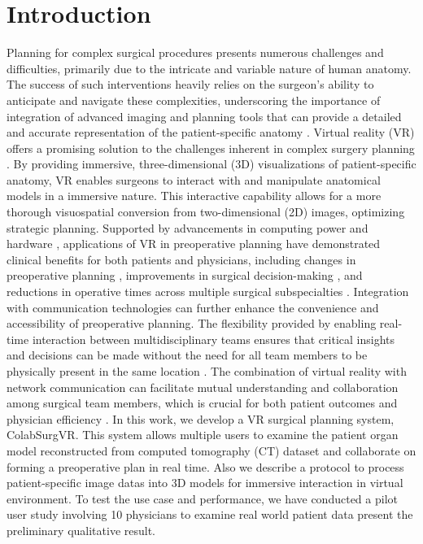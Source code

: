 \documentclass{bmcart}
\begin{document}
\section{Introduction}
Planning for complex surgical procedures presents numerous challenges and difficulties, primarily due to the intricate and variable nature of human anatomy. The success of such interventions heavily relies on the surgeon's ability to anticipate and navigate these complexities, underscoring the importance of integration of advanced imaging and planning tools that can provide a detailed and accurate representation of the patient-specific anatomy \cite{RN30}.
Virtual reality (VR) offers a promising solution to the challenges inherent in complex surgery planning \cite{RN32, RN31, RN2, RN24}. By providing immersive, three-dimensional (3D) visualizations of patient-specific anatomy, VR enables surgeons to interact with and manipulate anatomical models in a immersive nature. This interactive capability allows for a more thorough visuospatial conversion from two-dimensional (2D) images, optimizing strategic planning. Supported by advancements in computing power and hardware \cite{RN33}, applications of VR in preoperative planning have demonstrated clinical benefits for both patients and physicians, including changes in preoperative planning \cite{RN17, RN13, RN37, RN10, RN44, RN29}, improvements in surgical decision-making \cite{RN5}, and reductions in operative times \cite{RN36, RN28} across multiple surgical subspecialties \cite{RN38, RN2}.
Integration with communication technologies can further enhance the convenience and accessibility of preoperative planning. The flexibility provided by enabling real-time interaction between multidisciplinary teams ensures that critical insights and decisions can be made without the need for all team members to be physically present in the same location \cite{RN26, RN6}. The combination of virtual reality with network communication can facilitate mutual understanding and collaboration among surgical team members, which is crucial for both patient outcomes and physician efficiency \cite{RN62, RN25}.
In this work, we develop a VR surgical planning system, ColabSurgVR. This system allows multiple users to examine the patient organ model reconstructed from computed tomography (CT) dataset and collaborate on forming a preoperative plan in real time. Also we describe a protocol to process patient-specific image datas into 3D models for immersive interaction in virtual environment. To test the use case and performance, we have conducted a pilot user study involving 10 physicians to examine real world patient data present the preliminary qualitative result.
\end{document}
